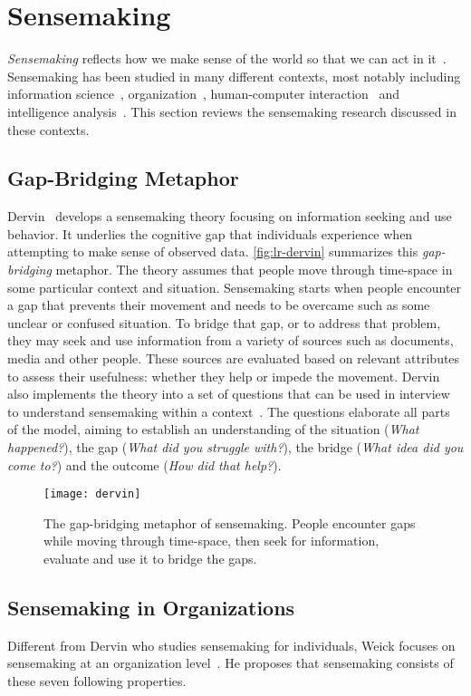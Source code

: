 \section{Sensemaking}
\label{sub:lr-sensemaking}
\emph{Sensemaking} reflects how we make sense of the world so that we can act in it~\cite{Snowden2005}. Sensemaking has been studied in many different contexts, most notably including information science~\cite{Dervin1983}, organization~\cite{Weick1995}, human-computer interaction~\cite{Russell1993} and intelligence analysis~\cite{Pirolli2005,Klein2003}. This section reviews the sensemaking research discussed in these contexts.

\subsection{Gap-Bridging Metaphor}
Dervin~\cite{Dervin1983} develops a sensemaking theory focusing on information seeking and use behavior. It underlies the cognitive gap that individuals experience when attempting to make sense of observed data. \autoref{fig:lr-dervin} summarizes this \emph{gap-bridging} metaphor. The theory assumes that people move through time-space in some particular context and situation. Sensemaking starts when people encounter a gap that prevents their movement and needs to be overcame such as some unclear or confused situation. To bridge that gap, or to address that problem, they may seek and use information from a variety of sources such as documents, media and other people. These sources are evaluated based on relevant attributes to assess their usefulness: whether they help or impede the movement. Dervin also implements the theory into a set of questions that can be used in interview to understand sensemaking within a context~\cite{Dervin1983}. The questions elaborate all parts of the model, aiming to establish an understanding of the situation (\emph{What happened?}), the gap (\emph{What did you struggle with?}), the bridge (\emph{What idea did you come to?}) and the outcome (\emph{How did that help?}).

\begin{figure}
	\centering
	\texttt{[image: dervin]}
	\caption[The gap-bridging metaphor of sensemaking]{The gap-bridging metaphor of sensemaking. People encounter gaps while moving through time-space, then seek for information, evaluate and use it to bridge the gaps. }
	\label{fig:lr-dervin}
\end{figure}

\subsection{Sensemaking in Organizations}
Different from Dervin who studies sensemaking for individuals, Weick focuses on sensemaking at an organization level~\cite{Weick1995}. He proposes that sensemaking consists of these seven following properties.


